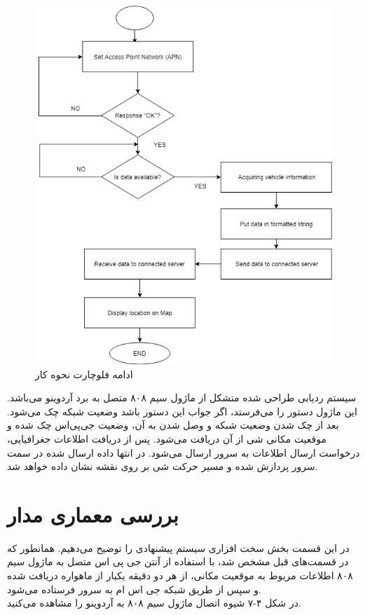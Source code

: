 \begin{figure}[!h]
	\centerline{\includegraphics[width=.9\textwidth]{continue-gsm}}
	\caption{ادامه فلوچارت نحوه کار  \cite{ElShafee2013}}
\end{figure}


سیستم ردیابی طراحی شده متشکل از ماژول سیم ۸۰۸ متصل به برد آردوینو می‌باشد. این ماژول دستور  را می‌فرستد، اگر جواب این دستور  باشد وضعیت شبکه چک می‌شود. بعد از چک شدن وضعیت شبکه و وصل شدن به آن، وضعیت جی‌پی‌اس چک شده و موقعیت مکانی شی از آن دریافت می‌شود. پس از دریافت اطلاعات جغرافیایی، درخواست ارسال اطلاعات به سرور ارسال می‌شود. در انتها داده ارسال شده در سمت سرور پردازش شده و مسیر حرکت شی بر روی نقشه نشان داده خواهد شد.
\\
\section{بررسی معماری مدار}
در این قسمت بخش سخت‌ افزاری سیستم پیشنهادی را توضیح می‌دهیم. همانطور که در قسمت‌های قبل مشخص شد، با استفاده از آنتن جی‌ پی اس متصل به ماژول سیم ۸۰۸ اطلاعات مربوط به موقعیت مکانی، از هر دو دقیقه یکبار از ماهواره دریافت شده و سپس از طریق شبکه جی اس ام به سرور فرستاده می‌شود. \\
در شکل ۴-۷ شیوه اتصال ماژول سیم ۸۰۸ به آردوینو را مشاهده می‌کنید.\\

